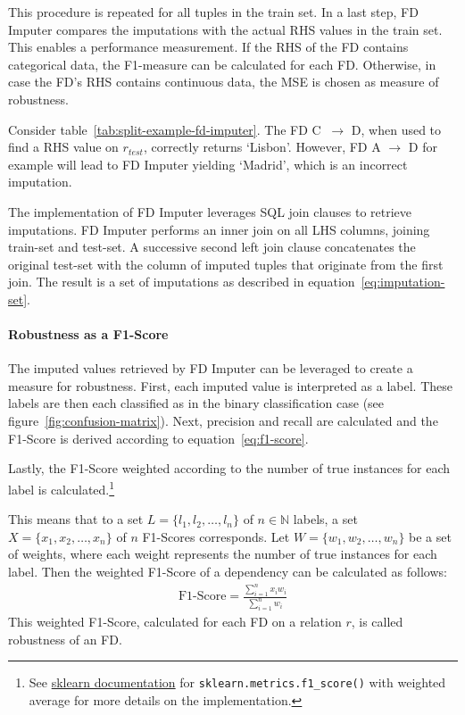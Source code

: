 This procedure is repeated for all tuples in the train set.
In a last step, FD Imputer compares the imputations with the actual RHS values in the train set.
This enables a performance measurement.
If the RHS of the FD contains categorical data, the F1-measure can be calculated for each FD.
Otherwise, in case the FD's RHS contains continuous data, the MSE is chosen as measure of robustness.

Consider table~\ref{tab:split-example-fd-imputer}.
The FD \textsc{C} \( \ \to \) \textsc{D}, when used to find a RHS value on \( r_{test} \), correctly returns `Lisbon'.
However, FD \textsc{A} \( \to \) \textsc{D} for example will lead to FD Imputer yielding `Madrid', which is an incorrect imputation.

The implementation of FD Imputer leverages SQL join clauses to retrieve imputations.
FD Imputer performs an inner join on all LHS columns, joining train-set and test-set.
A successive second left join clause concatenates the original test-set with the column of imputed tuples that originate from the first join.
The result is a set of imputations as described in equation~\ref{eq:imputation-set}.

\paragraph{Robustness as a F1-Score} The imputed values retrieved by FD Imputer can be leveraged to create a measure for robustness.
First, each imputed value is interpreted as a label.
These labels are then each classified as in the binary classification case (see figure~\ref{fig:confusion-matrix}).
Next, precision and recall are calculated and the F1-Score is derived according to equation~\ref{eq:f1-score}.

Lastly, the F1-Score weighted according to the number of true instances for each label is calculated.\footnote{See \href{https://scikit-learn.org/stable/modules/generated/sklearn.metrics.f1_score.html}{sklearn documentation} for \texttt{sklearn.metrics.f1\_score()} with weighted average for more details on the implementation.}

This means that to a set \( L = \{ l_1, l_2, \dots, l_n \} \) of \( n \in \mathbb{N} \) labels, a set \( X = \{ x_1, x_2, \dots, x_n \}\) of \( n \) F1-Scores corresponds.
Let \( W = \{ w_1, w_2, \dots, w_n \} \) be a set of weights, where each weight represents the number of true instances for each label.
Then the weighted F1-Score of a dependency can be calculated as follows:
\begin{align}\label{eq:fd-imputer-f1-score}
    \text{F1-Score} = \frac{\sum_{i=1}^{n} x_i w_i}{\sum_{i=1}^{n}w_i}
\end{align}
This weighted F1-Score, calculated for each FD on a relation \( r \), is called robustness of an FD.

